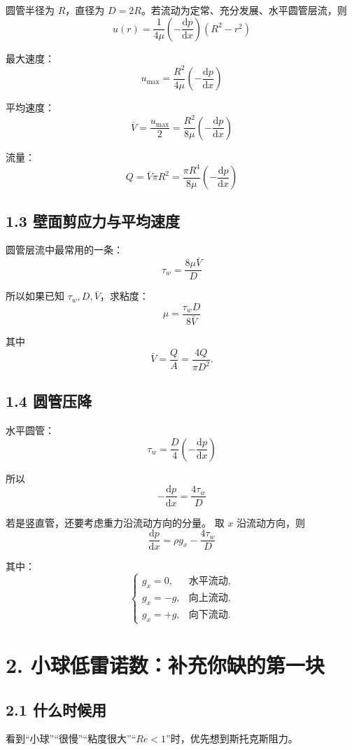 \documentclass[12pt,a4paper]{ctexart}
\newcommand{\dd}{\mathrm d}
\begin{document}
圆管半径为 \(R\)，直径为 \(D=2R\)。若流动为定常、充分发展、水平圆管层流，则
\[
\boxed{
u(r)=\frac{1}{4\mu}\left(-\frac{\dd p}{\dd x}\right)(R^2-r^2)
}
\]

最大速度：
\[
\boxed{
u_{\max}=\frac{R^2}{4\mu}\left(-\frac{\dd p}{\dd x}\right)
}
\]

平均速度：
\[
\boxed{
\bar V=\frac{u_{\max}}{2}
=\frac{R^2}{8\mu}\left(-\frac{\dd p}{\dd x}\right)
}
\]

流量：
\[
\boxed{
Q=\bar V\pi R^2
=\frac{\pi R^4}{8\mu}\left(-\frac{\dd p}{\dd x}\right)
}
\]

\subsection*{1.3 壁面剪应力与平均速度}

圆管层流中最常用的一条：
\[
\boxed{
\tau_w=\frac{8\mu \bar V}{D}
}
\]

所以如果已知 \(\tau_w,D,\bar V\)，求粘度：
\[
\boxed{
\mu=\frac{\tau_wD}{8\bar V}
}
\]

其中
\[
\bar V=\frac{Q}{A}=\frac{4Q}{\pi D^2}.
\]

\subsection*{1.4 圆管压降}

水平圆管：
\[
\boxed{
\tau_w=\frac{D}{4}\left(-\frac{\dd p}{\dd x}\right)
}
\]

所以
\[
\boxed{
-\frac{\dd p}{\dd x}=\frac{4\tau_w}{D}
}
\]

若是竖直管，还要考虑重力沿流动方向的分量。
取 \(x\) 沿流动方向，则
\[
\boxed{
\frac{\dd p}{\dd x}
=\rho g_x-\frac{4\tau_w}{D}
}
\]

其中：
\[
\begin{cases}
g_x=0, & \text{水平流动},\\
g_x=-g, & \text{向上流动},\\
g_x=+g, & \text{向下流动}.
\end{cases}
\]

\section*{2. 小球低雷诺数：补充你缺的第一块}

\subsection*{2.1 什么时候用}

看到“小球”“很慢”“粘度很大”“\(Re<1\)”时，优先想到斯托克斯阻力。
\end{document}
